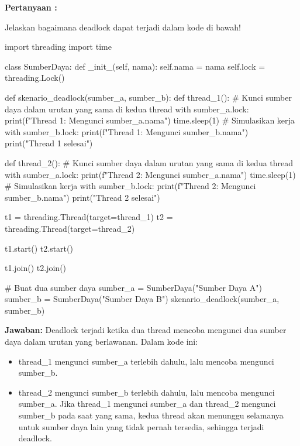 \documentclass[12pt]{article}
\begin{document}
\textbf{Pertanyaan :} 

\vspace{0.2cm}

Jelaskan bagaimana deadlock dapat terjadi dalam kode di bawah!

\vspace{0.2cm}

\begin{python}
import threading
import time

class SumberDaya:
    def _init_(self, nama):
        self.nama = nama
        self.lock = threading.Lock()

def skenario_deadlock(sumber_a, sumber_b):
    def thread_1():
        # Kunci sumber daya dalam urutan yang sama di kedua thread
        with sumber_a.lock:
            print(f"Thread 1: Mengunci {sumber_a.nama}")
            time.sleep(1)  # Simulasikan kerja
            with sumber_b.lock:
                print(f"Thread 1: Mengunci {sumber_b.nama}")
        print("Thread 1 selesai")

    def thread_2():
        # Kunci sumber daya dalam urutan yang sama di kedua thread
        with sumber_a.lock:
            print(f"Thread 2: Mengunci {sumber_a.nama}")
            time.sleep(1)  # Simulasikan kerja
            with sumber_b.lock:
                print(f"Thread 2: Mengunci {sumber_b.nama}")
        print("Thread 2 selesai")

    t1 = threading.Thread(target=thread_1)
    t2 = threading.Thread(target=thread_2)

    t1.start()
    t2.start()
    
    t1.join()
    t2.join()

# Buat dua sumber daya
sumber_a = SumberDaya("Sumber Daya A")
sumber_b = SumberDaya("Sumber Daya B")
skenario_deadlock(sumber_a, sumber_b)
\end{python} 

\textbf{Jawaban:} Deadlock terjadi ketika dua thread mencoba mengunci dua sumber daya dalam urutan yang berlawanan. Dalam kode ini:

\begin{itemize}
    \item {thread\_1} mengunci {sumber\_a} terlebih dahulu, lalu mencoba mengunci {sumber\_b}.
    \item {thread\_2} mengunci {sumber\_b} terlebih dahulu, lalu mencoba mengunci {sumber\_a}. Jika {thread\_1} mengunci {sumber\_a} dan {thread\_2} mengunci {sumber\_b} pada saat yang sama, kedua thread akan menunggu selamanya untuk sumber daya lain yang tidak pernah tersedia, sehingga terjadi deadlock.
\end{itemize}
\end{document}
